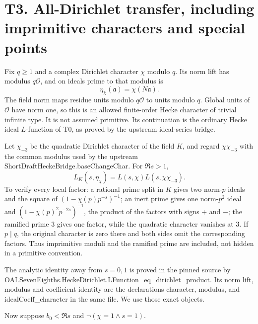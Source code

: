 \documentclass[11pt,a4paper]{article}
\newcommand{\sourcecode}[1]{{\small\ttfamily #1}}
\begin{document}
\hypertarget{t3.-all-dirichlet-transfer-including-imprimitive-characters-and-special-points}{%
\section{T3. All-Dirichlet transfer, including imprimitive characters
and special
points}\label{t3.-all-dirichlet-transfer-including-imprimitive-characters-and-special-points}}

Fix \(q\ge1\) and a complex Dirichlet character \(\chi\) modulo \(q\).
Its norm lift has modulus \(q\mathcal O\), and on ideals prime to that
modulus is \[
\eta_\chi(\mathfrak a)=\chi(N\mathfrak a).
\] The field norm maps residue units modulo \(q\mathcal O\) to units
modulo \(q\). Global units of \(\mathcal O\) have norm one, so this is
an allowed finite-order Hecke character of trivial infinite type. It is
not assumed primitive. Its continuation is the ordinary Hecke ideal
\(L\)-function of T0, as proved by the upstream ideal-series bridge.

Let \(\chi_{-3}\) be the quadratic Dirichlet character of the field
\(K\), and regard \(\chi\chi_{-3}\) with the common modulus used by the
upstream \sourcecode{Short\allowbreak{}Draft\allowbreak{}Hecke\allowbreak{}Bridge.\allowbreak{}base\allowbreak{}Change\allowbreak{}Char}. For \(\Re s>1\),
\[
L_K(s,\eta_\chi)=L(s,\chi)L(s,\chi\chi_{-3}).
\tag{T3.1}
\] To verify every local factor: a rational prime split in \(K\) gives
two norm-\(p\) ideals and the square of \((1-\chi(p)p^{-s})^{-1}\); an
inert prime gives one norm-\(p^2\) ideal and
\((1-\chi(p)^2p^{-2s})^{-1}\), the product of the factors with signs
\(+\) and \(-\); the ramified prime 3 gives one factor, while the
quadratic character vanishes at 3. If \(p\mid q\), the original
character is zero there and both sides omit the corresponding factors.
Thus imprimitive moduli and the ramified prime are included, not hidden
in a primitive convention.

The analytic identity away from \(s=0,\allowbreak{}1\) is proved in the pinned source
by
\sourcecode{OAI.\allowbreak{}Seven\allowbreak{}Eighths.\allowbreak{}Hecke\allowbreak{}Dirichlet.\allowbreak{}LFunction\_\allowbreak{}eq\_\allowbreak{}dirichlet\_\allowbreak{}product}.
Its norm lift, modulus and coefficient identity are the declarations
\sourcecode{character}, \sourcecode{modulus}, and \sourcecode{ideal\allowbreak{}Coeff\_\allowbreak{}character}
in the same file. We use those exact objects.

Now suppose \(b_0<\Re s\) and \(\neg(\chi=1\land s=1)\).
\end{document}
